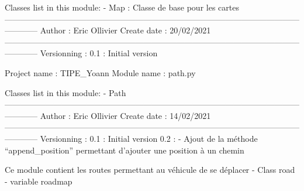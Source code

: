 \documentclass[a4paper,10pt,french]{sphinxmanual}
\begin{document}
Classes list in this module:
- Map : Classe de base pour les cartes
————————————————————————————————————————
Author : Eric Ollivier
Create date : 20/02/2021
————————————————————————————————————————
Versionning :
0.1 : Initial version

\label{\detokenize{index:module-roadmaps.path}}
Project name : TIPE\_Yoann
Module name : path.py

Classes list in this module:
- Path
————————————————————————————————————————
Author : Eric Ollivier
Create date : 14/02/2021
————————————————————————————————————————
Versionning :
0.1 : Initial version
0.2 :
- Ajout de la méthode “append\_position” permettant d’ajouter une position à un chemin

\label{\detokenize{index:module-roadmaps.road}}
Ce module contient les routes permettant au véhicule de se déplacer
- Class road
- variable roadmap
\end{document}
